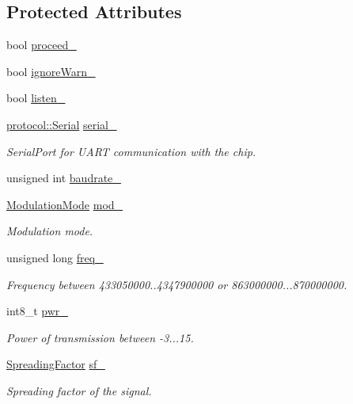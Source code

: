 \subsection*{Protected Attributes}
\begin{DoxyCompactItemize}
\item 
bool \hyperlink{classo_cpt_1_1_lo_ra_a63fc8aa4abe5d2df5cdee3757fc7cdf9}{proceed\+\_\+}
\item 
bool \hyperlink{classo_cpt_1_1_lo_ra_af293c469e9badc01ef82415211f729da}{ignore\+Warn\+\_\+}
\item 
bool \hyperlink{classo_cpt_1_1_lo_ra_a03b9303cbe41d8ad542054359109abd5}{listen\+\_\+}
\item 
\hyperlink{classo_cpt_1_1protocol_1_1_serial}{protocol\+::\+Serial} \hyperlink{classo_cpt_1_1_lo_ra_ab349fec280811fd5172f91652abe2775}{serial\+\_\+}
\begin{DoxyCompactList}\small\item\em Serial\+Port for U\+A\+RT communication with the chip. \end{DoxyCompactList}\item 
unsigned int \hyperlink{classo_cpt_1_1_lo_ra_a076f477e2096b2a49c8d4c25b79b1143}{baudrate\+\_\+}
\item 
\hyperlink{classo_cpt_1_1_lo_ra_a9791fe69244f3c8af2fd592d2573f939}{Modulation\+Mode} \hyperlink{classo_cpt_1_1_lo_ra_a98e0dc05a9e45a08afa36beddfe27072}{mod\+\_\+}
\begin{DoxyCompactList}\small\item\em Modulation mode. \end{DoxyCompactList}\item 
unsigned long \hyperlink{classo_cpt_1_1_lo_ra_ab57a9c27d2f5744eaf07bdee11a24aba}{freq\+\_\+}
\begin{DoxyCompactList}\small\item\em Frequency between 433050000..4347900000 or 863000000...870000000. \end{DoxyCompactList}\item 
int8\+\_\+t \hyperlink{classo_cpt_1_1_lo_ra_a26a74b857c4fe90af4217f38dc735220}{pwr\+\_\+}
\begin{DoxyCompactList}\small\item\em Power of transmission between -\/3...15. \end{DoxyCompactList}\item 
\hyperlink{classo_cpt_1_1_lo_ra_a8a682cc4db78b2afb14ad5cdb713b1e1}{Spreading\+Factor} \hyperlink{classo_cpt_1_1_lo_ra_acebd51c3b66932357035150f21e88d38}{sf\+\_\+}
\begin{DoxyCompactList}\small\item\em Spreading factor of the signal. \end{DoxyCompactList}\item 

\end{DoxyCompactItemize}
